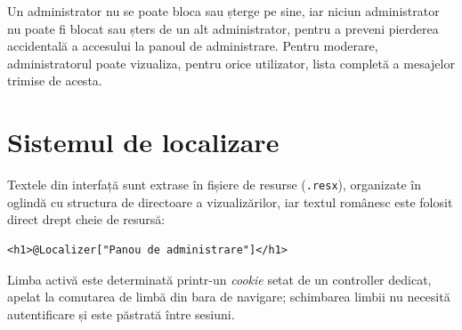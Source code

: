 Un administrator nu se poate bloca sau șterge pe sine, iar niciun administrator
nu poate fi blocat sau șters de un alt administrator, pentru a preveni pierderea
accidentală a accesului la panoul de administrare. Pentru moderare, administratorul poate
vizualiza, pentru orice utilizator, lista completă a mesajelor trimise de acesta.

\section{Sistemul de localizare}

Textele din interfață sunt extrase în fișiere de resurse (\texttt{.resx}),
organizate în oglindă cu structura de directoare a vizualizărilor, iar textul
românesc este folosit direct drept cheie de resursă:

\begin{lstlisting}[caption={Exemplu de utilizare a localizării într-o vizualizare}]
<h1>@Localizer["Panou de administrare"]</h1>
\end{lstlisting}

Limba activă este determinată printr-un \emph{cookie} setat de un controller
dedicat, apelat la comutarea de limbă din bara de navigare; schimbarea limbii nu
necesită autentificare și este păstrată între sesiuni.
